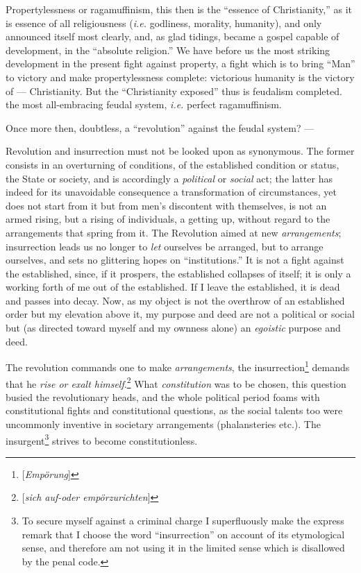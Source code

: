 Propertylessness or ragamuffinism, this then is the ``essence of 
Christianity,'' as it is essence of all religiousness (\textit{i.e.} 
godliness, morality, humanity), and only announced itself most clearly, and, 
as glad tidings, became a gospel capable of development, in the ``absolute 
religion.'' We have before us the most striking development in the present 
fight against property, a fight which is to bring ``Man'' to victory and 
make propertylessness complete: victorious humanity is the victory of --- Christianity. But the ``Christianity exposed'' thus is feudalism 
completed. the most all-embracing feudal system, \textit{i.e.} perfect 
ragamuffinism.

Once more then, doubtless, a ``revolution'' against the feudal system? ---

Revolution and insurrection must not be looked upon as synonymous. The former 
consists in an overturning of conditions, of the established condition or 
status, the State or society, and is accordingly a \textit{political} or 
\textit{social} act; the latter has indeed for its unavoidable consequence a 
transformation of circumstances, yet does not start from it but from men's 
discontent with themselves, is not an armed rising, but a rising of 
individuals, a getting up, without regard to the arrangements that spring from 
it. The Revolution aimed at new \textit{arrangements}; insurrection leads us 
no longer to \textit{let} ourselves be arranged, but to arrange ourselves, and 
sets no glittering hopes on ``institutions.'' It is not a fight against the 
established, since, if it prospers, the established collapses of itself; it is 
only a working forth of me out of the established. If I leave the established, 
it is dead and passes into decay. Now, as my object is not the overthrow of an 
established order but my elevation above it, my purpose and deed are not a 
political or social but (as directed toward myself and my ownness alone) an 
\textit{egoistic} purpose and deed.

The revolution commands one to make \textit{arrangements}, the 
insurrection\footnote{[\textit{Emp\"orung}]} demands that he \textit{rise or 
exalt himself}.\footnote{[\textit{sich auf-oder emp\"orzurichten}]} What 
\textit{constitution} was to be chosen, this question busied the revolutionary 
heads, and the whole political period foams with constitutional fights and 
constitutional questions, as the social talents too were uncommonly inventive 
in societary arrangements (phalansteries etc.). The insurgent\footnote{To 
secure myself against a criminal charge I superfluously make the express 
remark that I choose the word ``insurrection'' on account of its 
etymological sense, and therefore am not using it in the limited sense which 
is disallowed by the penal code.} strives to become constitutionless.

